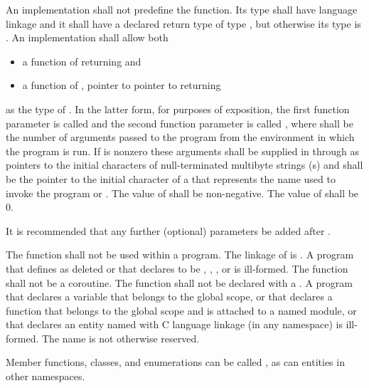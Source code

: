 \pnum
An implementation shall not predefine the  function.
Its type shall have \Cpp{} language linkage
and it shall have a declared return type of type
, but otherwise its type is .
%
An implementation shall allow both
\begin{itemize}
\item a function of \tcode{()} returning  and
\item a function of , pointer to pointer to  returning 
\end{itemize}
%
%
as the type of .
%
%
In the latter form, for purposes of exposition, the first function
parameter is called  and the second function parameter is
called , where  shall be the number of
arguments passed to the program from the environment in which the
program is run. If
 is nonzero these arguments shall be supplied in
 through  as pointers to the initial
characters of null-terminated multibyte strings (\ntmbs{}s)
and  shall be the pointer to
the initial character of a \ntmbs{} that represents the name used to
invoke the program or . The value of  shall be
non-negative. The value of  shall be 0.
\begin{note}
It
is recommended that any further (optional) parameters be added after
.
\end{note}

\pnum
The function  shall not be used within
a program.
%
The linkage of  is
. A program that defines  as
deleted or that declares  to be
, , , or  is ill-formed.
The function  shall not be a coroutine.
The  function shall not be declared with a
.
A program
that declares a variable  that belongs to the global scope, or
that declares a function  that belongs to the global scope and
is attached to a named module, or
that declares an entity named 
with C language linkage (in any namespace)
is ill-formed.
The name  is
not otherwise reserved.
\begin{example}
Member functions, classes, and
enumerations can be called , as can entities in other
namespaces.
\end{example}

